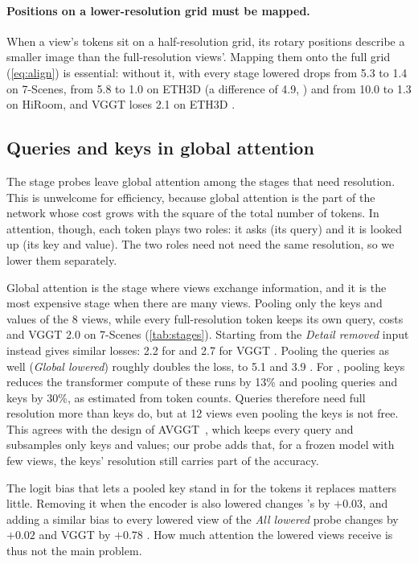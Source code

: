 \paragraph{Positions on a lower-resolution grid must be mapped.}
When a view's tokens sit on a half-resolution grid, its rotary positions describe a smaller image than the full-resolution views'. Mapping them onto the full grid (\cref{eq:align}) is essential: without it, \pithree with every stage lowered drops from 5.3 to 1.4 \auc on 7-Scenes, from 5.8 to 1.0 on ETH3D (a difference of 4.9, ) and from 10.0 to 1.3 on HiRoom, and VGGT loses 2.1 on ETH3D .

\subsection{Queries and keys in global attention}
\label{sec:keys}

The stage probes leave global attention among the stages that need resolution. This is unwelcome for efficiency, because global attention is the part of the network whose cost grows with the square of the total number of tokens. In attention, though, each token plays two roles: it asks (its query) and it is looked up (its key and value). The two roles need not need the same resolution, so we lower them separately.

Global attention is the stage where views exchange information, and it is the most expensive stage when there are many views. Pooling only the keys and values of the 8 views, while every full-resolution token keeps its own query, costs  \auc {} and VGGT 2.0  on 7-Scenes (\cref{tab:stages}). Starting from the \emph{Detail removed} input instead gives similar losses: 2.2 for \pithree {} and 2.7 for VGGT . Pooling the queries as well (\emph{Global lowered}) roughly doubles the loss, to 5.1 and 3.9 \auc. For \pithree, pooling keys reduces the transformer compute of these runs by 13\% and pooling queries and keys by 30\%, as estimated from token counts. Queries therefore need full resolution more than keys do, but at 12 views even pooling the keys is not free. This agrees with the design of AVGGT~\cite{sun2025avggt}, which keeps every query and subsamples only keys and values; our probe adds that, for a frozen model with few views, the keys' resolution still carries part of the accuracy.

The logit bias that lets a pooled key stand in for the tokens it replaces matters little. Removing it when the encoder is also lowered changes \pithree's \auc by $+0.03$, and adding a similar bias to every lowered view of the \emph{All lowered} probe changes \pithree by $+0.02$  and VGGT by $+0.78$ . How much attention the lowered views receive is thus not the main problem.

